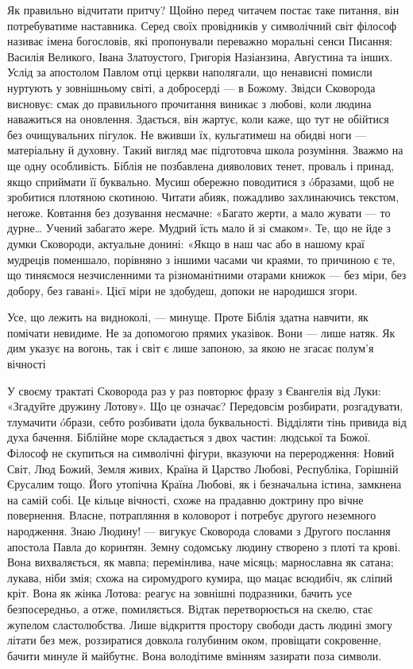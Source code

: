 Як правильно відчитати притчу? Щойно перед читачем постає таке питання, він
потребуватиме наставника. Серед своїх провідників у символічний світ філософ
називає імена богословів, які пропонували переважно моральні сенси Писання:
Василія Великого, Івана Златоустого, Григорія Назіанзина, Авґустина та інших.
Услід за апостолом Павлом отці церкви наполягали, що ненависні помисли нуртують
у зовнішньому світі, а добросерді — в Божому. Звідси Сковорода висновує: смак
до правильного прочитання виникає з любові, коли людина наважиться на
оновлення. Здається, він жартує, коли каже, що тут не обійтися без очищувальних
пігулок. Не вживши їх, кульгатимеш на обидві ноги — матеріальну й духовну.
Такий вигляд має підготовча школа розуміння. Зважмо на ще одну особливість.
Біблія не позбавлена дияволових тенет, проваль і принад, якщо сприймати її
буквально. Мусиш обережно поводитися з óбразами, щоб не зробитися плотяною
скотиною. Читати абияк, пожадливо захлинаючись текстом, негоже. Ковтання без
дозування несмачне: «Багато жерти, а мало жувати — то дурне… Учений забагато
жере. Мудрий їсть мало й зі смаком». Те, що не йде з думки Сковороди, актуальне
донині: «Якщо в наш час або в нашому краї мудреців поменшало, порівняно з
іншими часами чи краями, то причиною є те, що тиняємося незчисленними та
різноманітними отарами книжок — без міри, без добору, без гавані». Цієї міри не
здобудеш, допоки не народишся згори.

\begin{zznagolos}
Усе, що лежить на видноколі, — минуще. Проте Біблія здатна навчити, як помічати
невидиме. Не за допомогою прямих указівок. Вони — лише натяк. Як дим указує на
вогонь, так і світ є лише запоною, за якою не згасає полум’я вічності 	
\end{zznagolos}

У своєму трактаті Сковорода раз у раз повторює фразу з Євангелія від Луки:
«Згадуйте дружину Лотову». Що це означає? Передовсім розбирати, розгадувати,
тлумачити óбрази, себто розбивати ідола буквальності. Відділяти тінь привида
від духа бачення. Біблійне море складається з двох частин: людської та Божої.
Філософ не скупиться на символічні фігури, вказуючи на переродження: Новий
Світ, Люд Божий, Земля живих, Країна й Царство Любові, Республіка, Горішній
Єрусалим тощо. Його утопічна Країна Любові, як і безначальна істина, замкнена
на самій собі. Це кільце вічності, схоже на прадавню доктрину про вічне
повернення. Власне, потрапляння в коловорот і потребує другого неземного
народження. Знаю Людину! — вигукує Сковорода словами з Другого послання
апостола Павла до коринтян. Земну содомську людину створено з плоті та крові.
Вона вихваляється, як мавпа; перемінлива, наче місяць; марнославна як сатана;
лукава, ніби змія; схожа на сиромудрого кумира, що мацає всюдибіч, як сліпий
кріт. Вона як жінка Лотова: реа­гує на зовнішні подразники, бачить усе
безпосередньо, а отже, помиляється. Відтак перетворюється на скелю, стає
жупелом сластолюбства. Лише відкриття простору свободи дасть людині змогу
літати без меж, роззиратися довкола голубиним оком, провіщати сокровенне,
бачити минуле й майбутнє. Вона володітиме вмінням зазирати поза символи.

